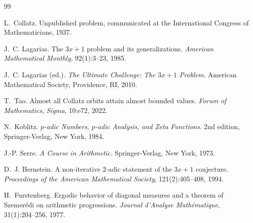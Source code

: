 \documentclass[12pt,a4paper]{article}
\begin{document}
\begin{thebibliography}{99}

L.~Collatz.
\newblock Unpublished problem, communicated at the International Congress of Mathematicians, 1937.

J.~C. Lagarias.
\newblock The $3x+1$ problem and its generalizations.
\newblock \emph{American Mathematical Monthly}, 92(1):3--23, 1985.

J.~C. Lagarias (ed.).
\newblock \emph{The Ultimate Challenge: The $3x+1$ Problem}.
\newblock American Mathematical Society, Providence, RI, 2010.

T.~Tao.
\newblock Almost all Collatz orbits attain almost bounded values.
\newblock \emph{Forum of Mathematics, Sigma}, 10:e72, 2022.

N.~Koblitz.
\newblock \emph{$p$-adic Numbers, $p$-adic Analysis, and Zeta Functions}.
\newblock 2nd edition, Springer-Verlag, New York, 1984.

J.-P. Serre.
\newblock \emph{A Course in Arithmetic}.
\newblock Springer-Verlag, New York, 1973.

D.~J. Bernstein.
\newblock A non-iterative 2-adic statement of the $3x+1$ conjecture.
\newblock \emph{Proceedings of the American Mathematical Society}, 121(2):405--408, 1994.

H.~Furstenberg.
\newblock Ergodic behavior of diagonal measures and a theorem of Szemer\'edi on arithmetic progressions.
\newblock \emph{Journal d'Analyse Math\'ematique}, 31(1):204--256, 1977.

\end{thebibliography}
\end{document}
